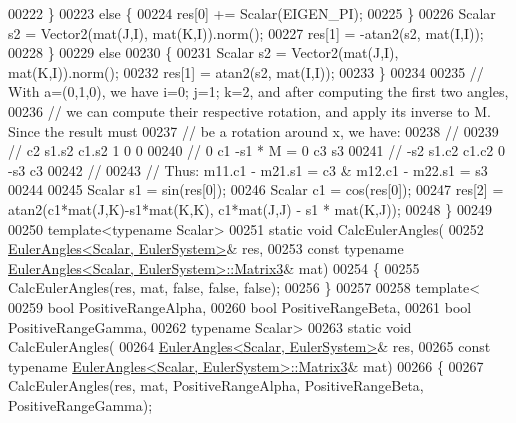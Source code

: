 \begin{DoxyCode}
00222         \}
00223         \textcolor{keywordflow}{else} \{
00224           res[0] += Scalar(EIGEN\_PI);
00225         \}
00226         Scalar s2 = Vector2(mat(J,I), mat(K,I)).norm();
00227         res[1] = -atan2(s2, mat(I,I));
00228       \}
00229       \textcolor{keywordflow}{else}
00230       \{
00231         Scalar s2 = Vector2(mat(J,I), mat(K,I)).norm();
00232         res[1] = atan2(s2, mat(I,I));
00233       \}
00234 
00235       \textcolor{comment}{// With a=(0,1,0), we have i=0; j=1; k=2, and after computing the first two angles,}
00236       \textcolor{comment}{// we can compute their respective rotation, and apply its inverse to M. Since the result must}
00237       \textcolor{comment}{// be a rotation around x, we have:}
00238       \textcolor{comment}{//}
00239       \textcolor{comment}{//  c2  s1.s2 c1.s2                   1  0   0 }
00240       \textcolor{comment}{//  0   c1    -s1       *    M    =   0  c3  s3}
00241       \textcolor{comment}{//  -s2 s1.c2 c1.c2                   0 -s3  c3}
00242       \textcolor{comment}{//}
00243       \textcolor{comment}{//  Thus:  m11.c1 - m21.s1 = c3  &   m12.c1 - m22.s1 = s3}
00244 
00245       Scalar s1 = sin(res[0]);
00246       Scalar c1 = cos(res[0]);
00247       res[2] = atan2(c1*mat(J,K)-s1*mat(K,K), c1*mat(J,J) - s1 * mat(K,J));
00248     \}
00249     
00250     \textcolor{keyword}{template}<\textcolor{keyword}{typename} Scalar>
00251     \textcolor{keyword}{static} \textcolor{keywordtype}{void} CalcEulerAngles(
00252       \hyperlink{class_eigen_1_1_euler_angles}{EulerAngles<Scalar, EulerSystem>}& res,
00253       \textcolor{keyword}{const} \textcolor{keyword}{typename} \hyperlink{group___core___module_class_eigen_1_1_matrix}{EulerAngles<Scalar, EulerSystem>::Matrix3}& 
      mat)
00254     \{
00255       CalcEulerAngles(res, mat, \textcolor{keyword}{false}, \textcolor{keyword}{false}, \textcolor{keyword}{false});
00256     \}
00257     
00258     \textcolor{keyword}{template}<
00259       \textcolor{keywordtype}{bool} PositiveRangeAlpha,
00260       \textcolor{keywordtype}{bool} PositiveRangeBeta,
00261       \textcolor{keywordtype}{bool} PositiveRangeGamma,
00262       \textcolor{keyword}{typename} Scalar>
00263     \textcolor{keyword}{static} \textcolor{keywordtype}{void} CalcEulerAngles(
00264       \hyperlink{class_eigen_1_1_euler_angles}{EulerAngles<Scalar, EulerSystem>}& res,
00265       \textcolor{keyword}{const} \textcolor{keyword}{typename} \hyperlink{group___core___module_class_eigen_1_1_matrix}{EulerAngles<Scalar, EulerSystem>::Matrix3}& 
      mat)
00266     \{
00267       CalcEulerAngles(res, mat, PositiveRangeAlpha, PositiveRangeBeta, PositiveRangeGamma);

\end{DoxyCode}
